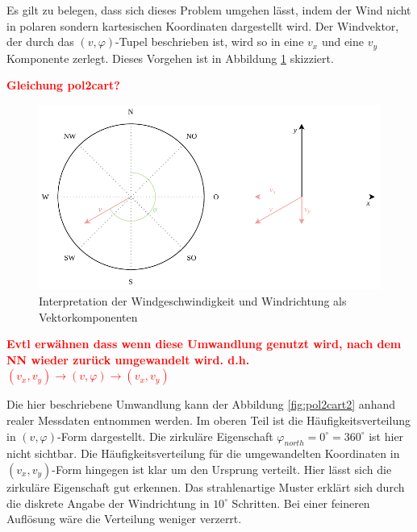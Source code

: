 \documentclass[
12pt, %
toc=listofnumbered, %
toc=chapterentrydotfill, %
numbers=noenddot, %
captions=tableheading, %
bibliography=numbered
]{scrreprt}
\newcommand{\highlight}[1]{\textbf{\textcolor{red}{#1}}}
\begin{document}
Es gilt zu belegen, dass sich dieses Problem umgehen lässt, indem der Wind nicht in polaren sondern kartesischen Koordinaten dargestellt wird. Der Windvektor, der durch das $(v,\varphi)$-Tupel beschrieben ist, wird so in eine $v_x$ und eine $v_y$ Komponente zerlegt. Dieses Vorgehen ist in Abbildung \ref{fig:pol2cart} skizziert.

\highlight{Gleichung pol2cart?}

\begin{figure}[tph]
	\begin{center}
		\includegraphics[scale = 1]{./images/pol2cart.pdf}
		\caption{Interpretation der Windgeschwindigkeit und Windrichtung als Vektorkomponenten}
		\label{fig:pol2cart}
	\end{center}
\end{figure}

\highlight{Evtl erwähnen dass wenn diese Umwandlung genutzt wird, nach dem NN wieder zurück umgewandelt wird. d.h. $(v_x,v_y) \rightarrow (v,\varphi) \rightarrow(v_x,v_y)$}

Die hier beschriebene Umwandlung kann der Abbildung \ref{fig:pol2cart2} anhand realer Messdaten entnommen werden. Im oberen Teil ist die Häufigkeitsverteilung in $(v,\varphi)$-Form dargestellt. Die zirkuläre Eigenschaft $\varphi_{north} = 0^\circ = 360^\circ$ ist hier nicht sichtbar. Die Häufigkeitsverteilung für die umgewandelten Koordinaten in $(v_x,v_y)$-Form hingegen ist klar um den Ursprung verteilt. Hier lässt sich die zirkuläre Eigenschaft gut erkennen. Das strahlenartige Muster erklärt sich durch die diskrete Angabe der Windrichtung in $10^\circ$ Schritten. Bei einer feineren Auflösung wäre die Verteilung weniger verzerrt.
\end{document}
